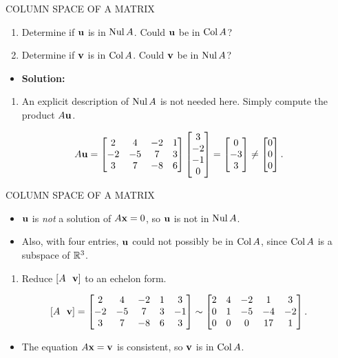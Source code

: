 \begin{frame}[shrink=14]{COLUMN SPACE OF A MATRIX}
\begin{enumerate}
\item[(a.)] Determine if $\mathbf{u}$ is in $\operatorname{Nul} A$. Could $\mathbf{u}$ be in $\operatorname{Col} A$?
\item[(b.)] Determine if $\mathbf{v}$ is in $\operatorname{Col} A$. Could $\mathbf{v}$ be in $\operatorname{Nul} A$?
\end{enumerate}
\begin{itemize}
\item \textbf{Solution:}
\end{itemize}
\begin{enumerate}
\item[(a.)] An explicit description of $\operatorname{Nul} A$ is not needed here. Simply compute the product $A\mathbf{u}$.
\end{enumerate}
\[
A\mathbf{u}=
\begin{bmatrix}2&4&-2&1\\-2&-5&7&3\\3&7&-8&6\end{bmatrix}
\begin{bmatrix}3\\-2\\-1\\0\end{bmatrix}
=\begin{bmatrix}0\\-3\\3\end{bmatrix}
\ne\begin{bmatrix}0\\0\\0\end{bmatrix}.
\]
\end{frame}

\begin{frame}[shrink=14]{COLUMN SPACE OF A MATRIX}
\begin{itemize}
\item $\mathbf{u}$ is \emph{not} a solution of $A\mathbf{x}=0$, so $\mathbf{u}$ is not in $\operatorname{Nul} A$.
\item Also, with four entries, $\mathbf{u}$ could not possibly be in $\operatorname{Col} A$, since $\operatorname{Col} A$ is a subspace of $\mathbb{R}^3$.
\end{itemize}
\begin{enumerate}
\item[(b.)] Reduce $[A\ \ \mathbf{v}]$ to an echelon form.
\end{enumerate}
\[
[A\ \ \mathbf{v}]=
\begin{bmatrix}2&4&-2&1&3\\-2&-5&7&3&-1\\3&7&-8&6&3\end{bmatrix}
\sim
\begin{bmatrix}2&4&-2&1&3\\0&1&-5&-4&-2\\0&0&0&17&1\end{bmatrix}.
\]
\begin{itemize}
\item The equation $A\mathbf{x}=\mathbf{v}$ is consistent, so $\mathbf{v}$ is in $\operatorname{Col} A$.
\end{itemize}
\end{frame}

